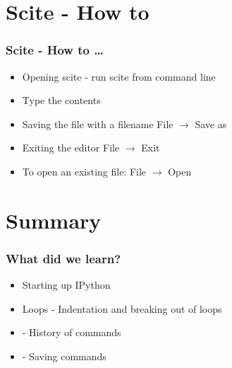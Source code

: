 \documentclass[14pt,compress]{beamer}
\newcommand{\kwrd}[1]{ \texttt{\textbf{\color{blue}{#1}}}  }
\begin{document}
\section{Scite - How to}
\begin{frame}[fragile]
  \frametitle{Scite - How to \ldots}
  \begin{itemize}
  \item Opening scite - run scite from command line
  \item Type the contents
  \item Saving the file with a filename \alert{File $\rightarrow$ Save as}
  \item Exiting the editor  \alert{File $\rightarrow$ Exit}
  \item To open an existing file: \alert{File $\rightarrow$ Open}
  \end{itemize}
\end{frame}

\section{Summary}
\begin{frame}[fragile]
  \frametitle{What did we learn?}
  \begin{itemize}
    \item Starting up IPython
    \item Loops - Indentation and breaking out of loops
    \item \kwrd{\%hist} - History of commands
    \item \kwrd{\%save} - Saving commands 
  \end{itemize}
\end{frame}
\end{document}
